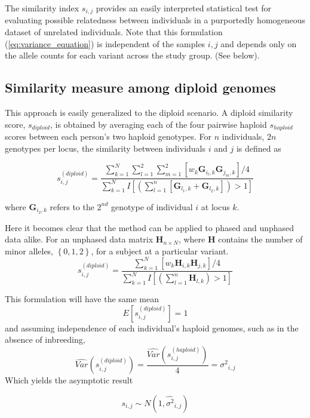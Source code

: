 The similarity index $s_{i,j}$ provides an easily interpreted statistical
test for evaluating possible relatedness between individuals in a
purportedly homogeneous dataset of unrelated individuals. Note that
this formulation (\ref{eq:variance_equation}) is independent of the samples $i,j$ and depends
only on the allele counts for each variant across the study group.
(See below).

\subsection{Similarity measure among diploid genomes}

This approach is easily generalized to the diploid scenario. A diploid
similarity score, $s_{diploid}$, is obtained by averaging each of
the four pairwise haploid $s_{haploid}$ scores between each person's
two haploid genotypes. For $n$ individuals, $2n$ genotypes per locus,
the similarity between individuals $i$ and $j$ is defined as

\[
s_{i,j}^{\left(diploid\right)}=\frac{\sum_{k=1}^{N}\sum_{l=1}^{2}\sum_{m=1}^{2}\left[w_{k}\mathbf{G}_{i_{l},k}\mathbf{G}_{j_{m},k}\right]/4}{\sum_{k=1}^{N}I\left[\left(\sum_{l=1}^{n}\left[\mathbf{G}_{l_{1},k}+\mathbf{G}_{l_{2},k}\right]\right)>1\right]}
\]

where $\mathbf{G}_{i_{2},k}$ refers to the $2^{nd}$ genotype of
individual $i$ at locus $k$.

Here it becomes clear that the method can be applied to phased and
unphased data alike. For an unphased data matrix $\mathbf{H}_{n\times N}$,
where $\mathbf{H}$ contains the number of minor alleles, $\left\{ 0,1,2\right\} $,
for a subject at a particular variant. 
\[
s_{i,j}^{\left(diploid\right)}=\frac{\sum_{k=1}^{N}\left[w_{k}\mathbf{H}_{i,k}\mathbf{H}_{j,k}\right]/4}{\sum_{k=1}^{N}I\left[\left(\sum_{l=1}^{n}\mathbf{H}_{l,k}\right)>1\right]}
\]

This formulation will have the same mean
\[
E\left[s_{i,j}^{\left(diploid\right)}\right]=1
\]
and assuming independence of each individual's haploid genomes, such
as in the absence of inbreeding,
\[
\hat{Var}\left(s_{i,j}^{\left(diploid\right)}\right)=\frac{\hat{Var}\left(s_{i,j}^{\left(haploid\right)}\right)}{4}=\hat{\sigma^{2}}_{i,j}
\]
Which yields the asymptotic result

\begin{equation}
s_{i,j}\sim N\left(1,\hat{\sigma^{2}}_{i,j}\right)\label{eq:null_distribution}
\end{equation}


